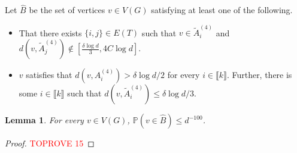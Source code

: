 \documentclass[notitlepage]{scrartcl}
\newcommand{\br}[1]{\llbracket{#1}\rrbracket}
\newtheorem{lemma}[thm]{Lemma}
\begin{document}
Let $\hat{B}$ be the set of vertices $v\in V(G)$ satisfying at least one of the following.
\begin{itemize}
    \item That there exists $\{i,j\}\in E(T)$ such that $v\in \tilde{A}_i^{(4)}$ and $d(v,\tilde{A}_j^{(4)})\notin \left[\frac{\delta\log d}{3}, 4C\log d\right]$.
    \item $v$ satisfies that $d(v,A_i^{(4)})>\delta \log d/2$ for every $i\in \br{k}$. Further, there is some $i\in \br{k}$ such that $d(v,\tilde{A}_i^{(4)})\le \delta\log d/3$.
\end{itemize} 
\begin{lemma}\label{l: hat B}
For every $v\in V(G)$, $\mathbb{P}\left(v\in \hat{B}\right)\le d^{-100}$.
\end{lemma}
\begin{proof}\textcolor{red}{TOPROVE 15}\end{proof}
\end{document}
